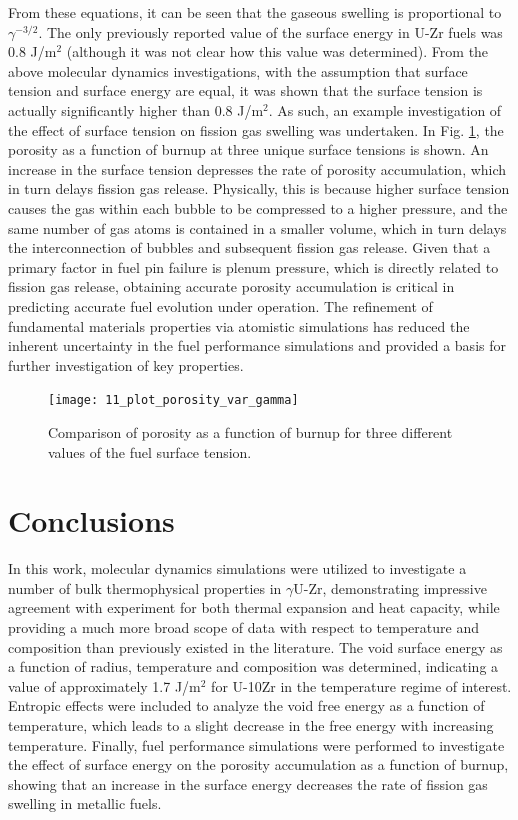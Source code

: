 \documentclass[review]{elsarticle}
\begin{document}
From these equations, it can be seen that the gaseous swelling is proportional to $\gamma^{-3/2}$. The only previously reported value of the surface energy in U-Zr fuels was 0.8 J/m$^2$ \cite{tsuboi1992} (although it was not clear how this value was determined). From the above molecular dynamics investigations, with the assumption that surface tension and surface energy are equal, it was shown that the surface tension is actually significantly higher than 0.8 J/m$^2$. As such, an example investigation of the effect of surface tension on fission gas swelling was undertaken. In Fig. \ref{fig:plot_porosity_var_gamma}, the porosity as a function of burnup at three unique surface tensions is shown. An increase in the surface tension depresses the rate of porosity accumulation, which in turn delays fission gas release. Physically, this is because higher surface tension causes the gas within each bubble to be compressed to a higher pressure, and the same number of gas atoms is contained in a smaller volume, which in turn delays the interconnection of bubbles and subsequent fission gas release. Given that a primary factor in fuel pin failure is plenum pressure, which is directly related to fission gas release, obtaining accurate porosity accumulation is critical in predicting accurate fuel evolution under operation. The refinement of fundamental materials properties via atomistic simulations has reduced the inherent uncertainty in the fuel performance simulations and provided a basis for further investigation of key properties. 

\begin{figure}[!htp]
\begin{center}
\texttt{[image: 11\_plot\_porosity\_var\_gamma]}
\end{center}
\caption{Comparison of porosity as a function of burnup for three different values of the fuel surface tension.}
\label{fig:plot_porosity_var_gamma}
\end{figure}

\FloatBarrier

\section{Conclusions}

In this work, molecular dynamics simulations were utilized to investigate a number of bulk thermophysical properties in $\gamma$U-Zr, demonstrating impressive agreement with experiment for both thermal expansion and heat capacity, while providing a much more broad scope of data with respect to temperature and composition than previously existed in the literature. The void surface energy as a function of radius, temperature and composition was determined, indicating a value of approximately 1.7 J/m$^2$ for U-10Zr in the temperature regime of interest. Entropic effects were included to analyze the void free energy as a function of temperature, which leads to a slight decrease in the free energy with increasing temperature. Finally, fuel performance simulations were performed to investigate the effect of surface energy on the porosity accumulation as a function of burnup, showing that an increase in the surface energy decreases the rate of fission gas swelling in metallic fuels. 
\end{document}

